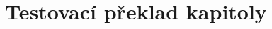 \documentclass[11pt,a4paper]{book}
\providecommand{\kapsoubor}{kapitoly/03}
\begin{document}
\chapter{Testovací překlad kapitoly}

\end{document}
